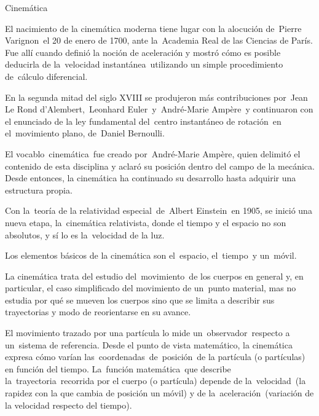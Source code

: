 \begin{myblock}{Cinemática}
	
\begin{small}
El nacimiento de la cinemática moderna tiene lugar con la alocución de Pierre Varignon el 20 de enero de 1700, ante la Academia Real de las Ciencias de París. Fue allí cuando definió la noción de aceleración y mostró cómo es posible deducirla de la velocidad instantánea utilizando un simple procedimiento de cálculo diferencial.

\vspace{2mm} En la segunda mitad del siglo XVIII se produjeron más contribuciones por Jean Le Rond d'Alembert, Leonhard Euler y André-Marie Ampère y continuaron con el enunciado de la ley fundamental del centro instantáneo de rotación en el movimiento plano, de Daniel Bernoulli.

\vspace{2mm} El vocablo cinemática fue creado por André-Marie Ampère, quien delimitó el contenido de esta disciplina y aclaró su posición dentro del campo de la mecánica. Desde entonces, la cinemática ha continuado su desarrollo hasta adquirir una estructura propia.

\vspace{2mm} Con la teoría de la relatividad especial de Albert Einstein en 1905, se inició una nueva etapa, la cinemática relativista, donde el tiempo y el espacio no son absolutos, y sí lo es la velocidad de la luz.

\vspace{2mm} Los elementos básicos de la cinemática son el espacio, el tiempo y un móvil.

\vspace{2mm} La cinemática trata del estudio del movimiento de los cuerpos en general y, en particular, el caso simplificado del movimiento de un punto material, mas no estudia por qué se mueven los cuerpos sino que se limita a describir sus trayectorias y modo de reorientarse en su avance.

\vspace{2mm} El movimiento trazado por una partícula lo mide un observador respecto a un sistema de referencia. Desde el punto de vista matemático, la cinemática expresa cómo varían las coordenadas de posición de la partícula (o partículas) en función del tiempo. La función matemática que describe la trayectoria recorrida por el cuerpo (o partícula) depende de la velocidad (la rapidez con la que cambia de posición un móvil) y de la aceleración (variación de la velocidad respecto del tiempo).


\end{small}
\end{myblock}
